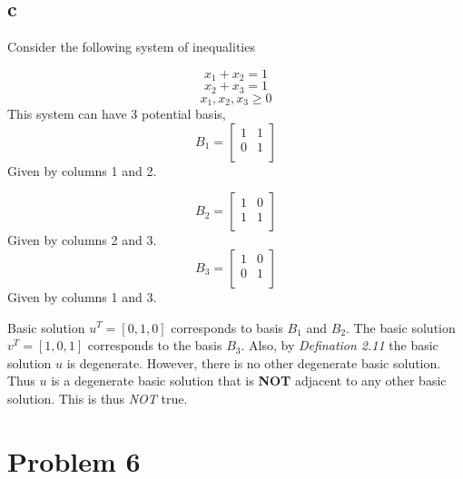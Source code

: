 \documentclass[11pt]{article}
\begin{document}
\subsection*{c}
Consider the following system of inequalities

\[ x_1 + x_2 = 1\]
\[x_2 + x_3 = 1\]
\[x_1,x_2,x_3 \ge 0\]
This system can have 3 potential basis, 
\[B_1 =  \begin{bmatrix}
    1 & 1  \\
    0 & 1 \\
    \end{bmatrix}\]
Given by columns 1 and 2.

\[B_2 =  \begin{bmatrix}
    1 & 0  \\
    1 & 1 \\
    \end{bmatrix}\]
Given by columns 2 and 3.
\[B_3 =  \begin{bmatrix}
    1 & 0  \\
    0 & 1 \\
    \end{bmatrix}\]
Given by columns 1 and 3.

Basic solution $u^T = [0,1,0]$ corresponds to basis $B_1$ and $B_2$. The basic solution $v^T = [1,0,1]$ corresponds to the basis $B_3$. Also, by \textit{Defination 2.11} the basic solution $u$ is degenerate. However, there is no other degenerate basic solution. Thus $u$ is a degenerate basic solution that is \textbf{NOT} adjacent to any other basic solution. This is thus \textit{NOT} true.

\section*{Problem 6}
\end{document}
